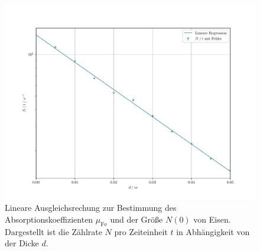 \begin{figure}[h]
    \centering
    \includegraphics[width=13.5cm]{eisen.pdf}
    \caption{Lineare Ausgleichsrechung zur Bestimmung des Absorptionskoeffizienten $\mu_\text{Fe}$ und der Größe $N\left(0\right)$ von Eisen. 
    Dargestellt ist die Zählrate $N$ pro Zeiteinheit $t$ in Abhängigkeit von der Dicke $d$.}
    \label{fig:afig2}
\end{figure}
\FloatBarrier

